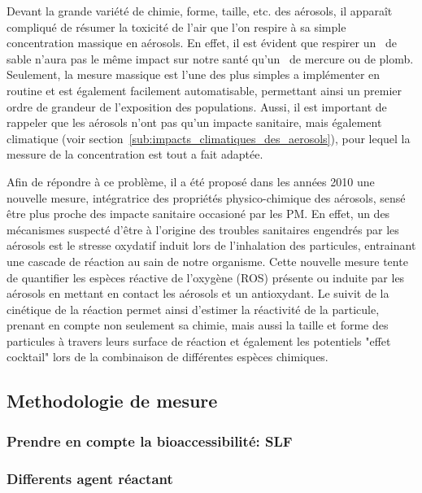 Devant la grande variété de chimie, forme, taille, etc. des aérosols, il apparaît
compliqué de résumer la toxicité de l'air que l'on respire à sa simple concentration
massique en aérosols. En effet, il est évident que respirer un~\si{\ugm} de sable n'aura
pas le même impact sur notre santé qu'un~\si{\ugm} de mercure ou de plomb.  Seulement, la
mesure massique est l'une des plus simples a implémenter en routine et est également
facilement automatisable, permettant ainsi un premier ordre de grandeur de l'exposition
des populations. Aussi, il est important de rappeler que les aérosols n'ont pas qu'un
impacte sanitaire, mais également climatique (voir
section~\ref{sub:impacts_climatiques_des_aerosols}), pour lequel la messure de la
concentration est tout a fait adaptée.

Afin de répondre à ce problème, il a été proposé dans les années 2010 une nouvelle mesure,
intégratrice des propriétés physico-chimique des aérosols, sensé être plus proche des
impacte sanitaire occasioné par les PM. En effet, un des mécanismes suspecté d'être à
l'origine des troubles sanitaires engendrés par les aérosols est le stresse oxydatif
induit lors de l'inhalation des particules, entrainant une cascade de réaction au sain de
notre organisme.
Cette nouvelle mesure tente de quantifier les espèces réactive de l'oxygène (ROS) présente
ou induite par les aérosols en mettant en contact les aérosols et un antioxydant.
Le suivit de la cinétique de la réaction permet ainsi d'estimer la réactivité de la
particule, prenant en compte non seulement sa chimie, mais aussi la taille et forme des
particules à travers leurs surface de réaction et également les potentiels "effet
cocktail" lors de la combinaison de différentes espèces chimiques.

\subsection{Methodologie de mesure}%
\label{sub:methodologie_de_mesure}

\subsubsection{Prendre en compte la bioaccessibilité: SLF}%
\label{sub:prendre_en_compte_la_bioaccessibilite_slf}

\subsubsection{Differents agent réactant}%
\label{ssub:differents_agent_reactant}

